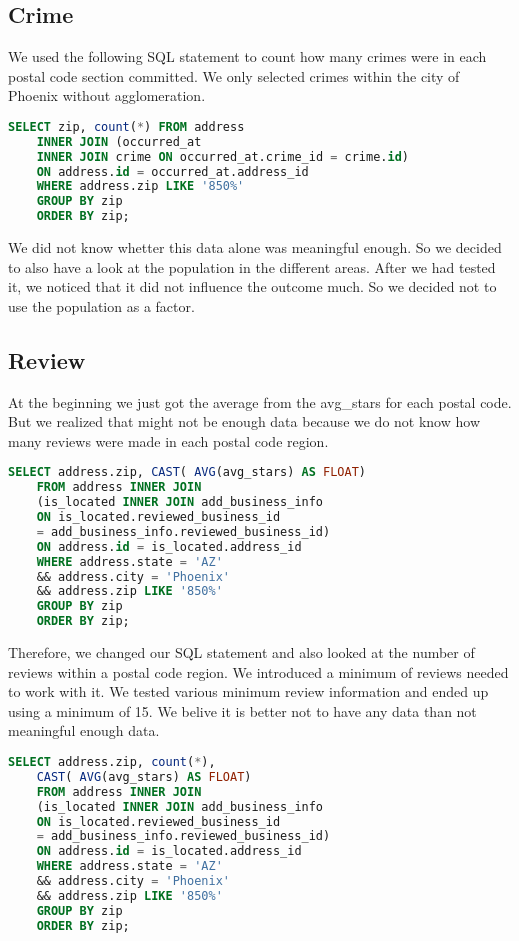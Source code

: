 \subsection*{Crime}
We used the following SQL statement to count how many crimes were in each postal code section committed. We only selected crimes within the city of Phoenix without agglomeration.
\begin{lstlisting}[language=SQL]
    SELECT zip, count(*) FROM address 
    INNER JOIN (occurred_at 
    INNER JOIN crime ON occurred_at.crime_id = crime.id) 
    ON address.id = occurred_at.address_id 
    WHERE address.zip LIKE '850%'
    GROUP BY zip 
    ORDER BY zip;
\end{lstlisting}
We did not know whetter this data alone was meaningful enough. So we decided to also have a look at the population in the different areas. After we had tested it, we noticed that it did not influence the outcome much. So we decided not to use the population as a factor.

\subsection*{Review}
At the beginning we just got the average from the avg\_stars for each postal code. But we realized that might not be enough data because we do not know how many reviews were made in each postal code region.
\begin{lstlisting}[language=SQL]
    SELECT address.zip, CAST( AVG(avg_stars) AS FLOAT) 
    FROM address INNER JOIN 
    (is_located INNER JOIN add_business_info 
    ON is_located.reviewed_business_id 
    = add_business_info.reviewed_business_id) 
    ON address.id = is_located.address_id 
    WHERE address.state = 'AZ' 
    && address.city = 'Phoenix' 
    && address.zip LIKE '850%' 
    GROUP BY zip 
    ORDER BY zip;
\end{lstlisting}
Therefore, we changed our SQL statement and also looked at the number of reviews within a postal code region. We introduced a minimum of reviews needed to work with it. We tested various minimum review information and ended up using a minimum of 15. We belive it is better not to have any data than not meaningful enough data.
\begin{lstlisting}[language=SQL]
    SELECT address.zip, count(*), 
    CAST( AVG(avg_stars) AS FLOAT) 
    FROM address INNER JOIN 
    (is_located INNER JOIN add_business_info 
    ON is_located.reviewed_business_id 
    = add_business_info.reviewed_business_id) 
    ON address.id = is_located.address_id 
    WHERE address.state = 'AZ' 
    && address.city = 'Phoenix' 
    && address.zip LIKE '850%'
    GROUP BY zip 
    ORDER BY zip;
\end{lstlisting}

